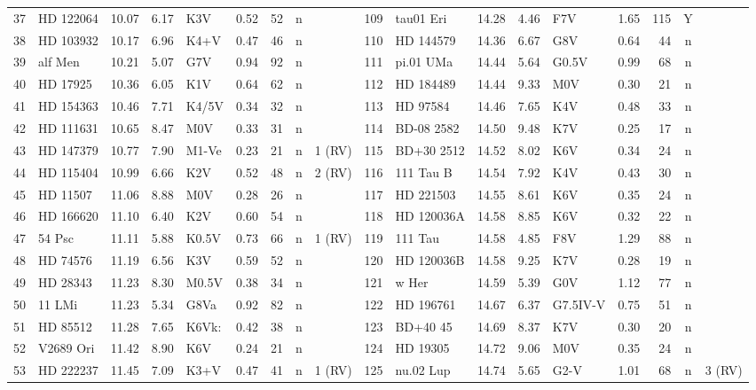 \begin{landscape}
\begin{longtable}{r l r r l r r c l @{\;\vrule\;} r l r r l r r c l}
37 & HD 122064 & 10.07 & 6.17 & K3V & 0.52 & 52 & n &  & 109 & tau01 Eri & 14.28 & 4.46 & F7V & 1.65 & 115 & Y &  \\
38 & HD 103932 & 10.17 & 6.96 & K4+V & 0.47 & 46 & n &  & 110 & HD 144579 & 14.36 & 6.67 & G8V & 0.64 & 44 & n &  \\
39 & alf Men & 10.21 & 5.07 & G7V & 0.94 & 92 & n &  & 111 & pi.01 UMa & 14.44 & 5.64 & G0.5V & 0.99 & 68 & n &  \\
40 & HD 17925 & 10.36 & 6.05 & K1V & 0.64 & 62 & n &  & 112 & HD 184489 & 14.44 & 9.33 & M0V & 0.30 & 21 & n &  \\
41 & HD 154363 & 10.46 & 7.71 & K4/5V & 0.34 & 32 & n &  & 113 & HD 97584 & 14.46 & 7.65 & K4V & 0.48 & 33 & n &  \\
42 & HD 111631 & 10.65 & 8.47 & M0V & 0.33 & 31 & n &  & 114 & BD-08 2582 & 14.50 & 9.48 & K7V & 0.25 & 17 & n &  \\
43 & HD 147379 & 10.77 & 7.90 & M1-Ve & 0.23 & 21 & n & 1 (RV) & 115 & BD+30 2512 & 14.52 & 8.02 & K6V & 0.34 & 24 & n &  \\
44 & HD 115404 & 10.99 & 6.66 & K2V & 0.52 & 48 & n & 2 (RV) & 116 & 111 Tau B & 14.54 & 7.92 & K4V & 0.43 & 30 & n &  \\
45 & HD 11507 & 11.06 & 8.88 & M0V & 0.28 & 26 & n &  & 117 & HD 221503 & 14.55 & 8.61 & K6V & 0.35 & 24 & n &  \\
46 & HD 166620 & 11.10 & 6.40 & K2V & 0.60 & 54 & n &  & 118 & HD 120036A & 14.58 & 8.85 & K6V & 0.32 & 22 & n &  \\
47 & 54 Psc & 11.11 & 5.88 & K0.5V & 0.73 & 66 & n & 1 (RV) & 119 & 111 Tau & 14.58 & 4.85 & F8V & 1.29 & 88 & n &  \\
48 & HD 74576 & 11.19 & 6.56 & K3V & 0.59 & 52 & n &  & 120 & HD 120036B & 14.58 & 9.25 & K7V & 0.28 & 19 & n &  \\
49 & HD 28343 & 11.23 & 8.30 & M0.5V & 0.38 & 34 & n &  & 121 & w Her & 14.59 & 5.39 & G0V & 1.12 & 77 & n &  \\
50 & 11 LMi & 11.23 & 5.34 & G8Va & 0.92 & 82 & n &  & 122 & HD 196761 & 14.67 & 6.37 & G7.5IV-V & 0.75 & 51 & n &  \\
51 & HD 85512 & 11.28 & 7.65 & K6Vk: & 0.42 & 38 & n &  & 123 & BD+40 45 & 14.69 & 8.37 & K7V & 0.30 & 20 & n &  \\
52 & V2689 Ori & 11.42 & 8.90 & K6V & 0.24 & 21 & n &  & 124 & HD 19305 & 14.72 & 9.06 & M0V & 0.35 & 24 & n &  \\
53 & HD 222237 & 11.45 & 7.09 & K3+V & 0.47 & 41 & n & 1 (RV) & 125 & nu.02 Lup & 14.74 & 5.65 & G2-V & 1.01 & 68 & n & 3 (RV) \\

\end{longtable}
\end{landscape}
